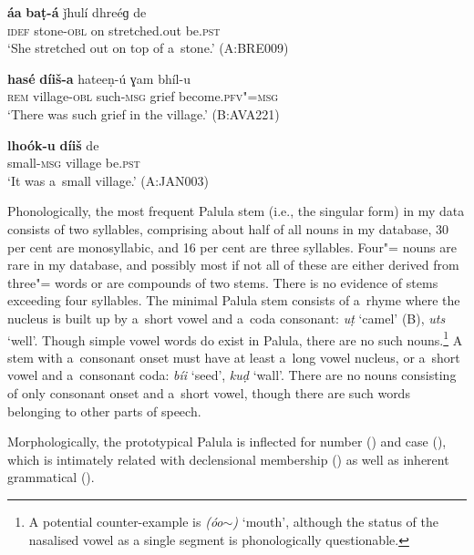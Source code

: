 \begin{exe}
\ex
\label{ex:4-4}
\gll \textbf{áa} \textbf{baṭ-á} ǰhulí dhreéɡ de \\ 
\textsc{idef} stone-\textsc{obl} on stretched.out be.\textsc{pst} \\
\glt `She stretched out on top of a~stone.' (A:BRE009)

\ex
\label{ex:4-5}
\gll \textbf{hasé} \textbf{díiš-a} hateeṇ-ú ɣam bhíl-u \\
	\textsc{rem} village-\textsc{obl} such-\textsc{msg} grief become.\textsc{pfv"=msg} \\
\glt `There was such grief in the village.' (B:AVA221)

\ex
\label{ex:4-5b}
\gll \textbf{lhoók-u} \textbf{díiš} de \\
small-\textsc{msg} village be.\textsc{pst} \\
\glt `It was a~small village.' (A:JAN003)
\end{exe}


Phonologically, the most frequent Palula  stem (i.e., the  singular form) in my data consists of two syllables, comprising about half of all nouns in my database, 30 per cent are monosyllabic, and 16 per cent are three syllables. Four"= nouns are rare in my database, and possibly most if not all of these are either derived from three"= words or are compounds of two  stems. There is no evidence of  stems exceeding four syllables. The minimal Palula  stem consists of a~rhyme where the nucleus is built up by a~short vowel and a~coda consonant: \textit{uṭ} `camel' (B), \textit{uts} `well'. Though simple vowel words do exist in Palula, there are no such nouns.\footnote{A potential counter-example is \textit{(óo$\sim$)} `mouth', although the status of the nasalised vowel as a single segment is phonologically questionable.} A  stem with a~consonant onset must have at least a~long vowel nucleus, or a~short vowel and a~consonant coda: \textit{bíi} `seed', \textit{kuḍ} `wall'. There are no nouns consisting of only consonant onset and a~short vowel, though there are such words belonging to other parts of speech.


Morphologically, the prototypical Palula  is inflected for number () and case (), which is intimately related with declensional membership () as well as inherent grammatical  (). 


